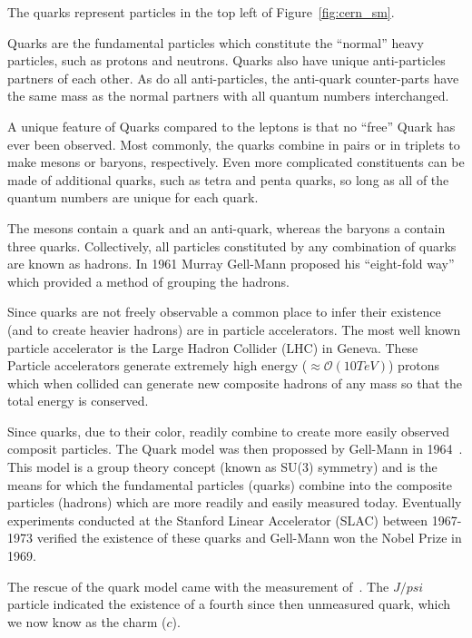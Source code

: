 The quarks represent particles in the top left of Figure~\ref{fig:cern_sm}.

Quarks are the fundamental particles which constitute the ``normal'' heavy particles, such as protons and neutrons.
Quarks also have unique anti-particles partners of each other.
As do all anti-particles, the anti-quark counter-parts have the same mass as the normal partners with all quantum numbers interchanged.

A unique feature of Quarks compared to the leptons is that no ``free'' Quark has ever been observed.
Most commonly, the quarks combine in pairs or in triplets to make mesons or baryons, respectively.
Even more complicated constituents can be made of additional quarks, such as tetra and penta quarks, so long as all of the quantum numbers are unique for each quark.

The mesons contain a quark and an anti-quark, whereas the baryons a contain three quarks.
Collectively, all particles constituted by any combination of quarks are known as hadrons.
In 1961 Murray Gell-Mann proposed his ``eight-fold way''~\citep{eightfold_way_osti_4008239} which provided a method of grouping the hadrons.

Since quarks are not freely observable a common place to infer their existence (and to create heavier hadrons) are in particle accelerators.
The most well known particle accelerator is the Large Hadron Collider (LHC) in Geneva.
These Particle accelerators generate extremely high energy ($\approx \mathcal{O}(10 TeV)$) protons which when collided can generate new composite hadrons of any mass so that the total energy is conserved.

Since quarks, due to their color, readily combine to create more easily observed composit particles.
The Quark model was then propossed by Gell-Mann in 1964~\citep{quark_model_GELLMANN1964214}.
This model is a group theory concept (known as SU(3) symmetry) and is the means for which the fundamental particles (quarks) combine into the composite particles (hadrons) which are more readily and easily measured today.
Eventually experiments conducted at the Stanford Linear Accelerator (SLAC) between 1967-1973 verified the existence of these quarks and Gell-Mann won the Nobel Prize in 1969.

The rescue of the quark model came with the measurement of~\citep{Jpsi_PhysRevLett.33.1404}.
The $J/psi$ particle indicated the existence of a fourth since then unmeasured quark, which we now know as the charm ($c$).


